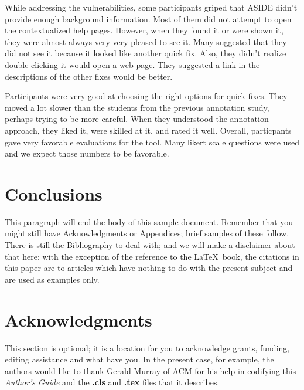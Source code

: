 \documentclass[twoside,letterpaper]{soups}
\begin{document}
While addressing the vulnerabilities, some participants griped that ASIDE didn't provide enough background information. Most of them did not attempt to open the contextualized help pages. However, when they found it or were shown it, they were almost always very very pleased to see it. Many suggested that they did not see it because it looked like another quick fix. Also, they didn't realize double clicking it would open a web page. They suggested a link in the descriptions of the other fixes would be better.

Participants were very good at choosing the right options for quick fixes. They moved a lot slower than the students from the previous annotation study, perhaps trying to be more careful. When they understood the annotation approach, they liked it, were skilled at it, and rated it well. Overall, particpants gave very favorable evaluations for the tool. Many likert scale questions were used and we expect those numbers to be favorable.
 
 

\section{Conclusions}
This paragraph will end the body of this sample document.
Remember that you might still have Acknowledgments or
Appendices; brief samples of these
follow.  There is still the Bibliography to deal with; and
we will make a disclaimer about that here: with the exception
of the reference to the \LaTeX\ book, the citations in
this paper are to articles which have nothing to
do with the present subject and are used as
examples only.

\section{Acknowledgments}
This section is optional; it is a location for you
to acknowledge grants, funding, editing assistance and
what have you.  In the present case, for example, the
authors would like to thank Gerald Murray of ACM for
his help in codifying this \textit{Author's Guide}
and the \textbf{.cls} and \textbf{.tex} files that it describes.

%

%
%
\appendix
\end{document}

